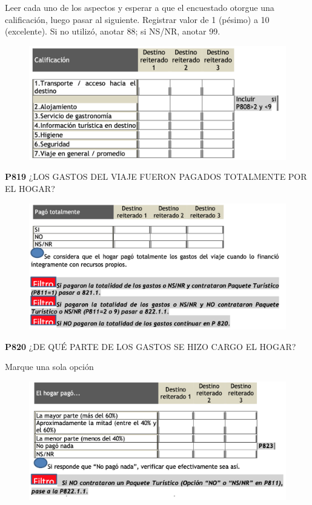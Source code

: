 \documentclass[
  openany]{book}
\begin{document}
Leer cada uno de los aspectos y esperar a que el encuestado otorgue una calificación, luego pasar al siguiente. Registrar valor de 1 (pésimo) a 10 (excelente). Si no utilizó, anotar 88; si NS/NR, anotar 99.

\begin{figure}

{\centering \includegraphics[width=1\linewidth]{imagenes/figura6-275} 

}

\end{figure}

\textbf{P819} ¿LOS GASTOS DEL VIAJE FUERON PAGADOS TOTALMENTE POR EL HOGAR?

\begin{figure}

{\centering \includegraphics[width=1\linewidth]{imagenes/figura6-276} 

}

\end{figure}

\textbf{P820} ¿DE QUÉ PARTE DE LOS GASTOS SE HIZO CARGO EL HOGAR?

Marque una sola opción

\begin{figure}

{\centering \includegraphics[width=1\linewidth]{imagenes/figura6-277} 

}

\end{figure}
\end{document}
